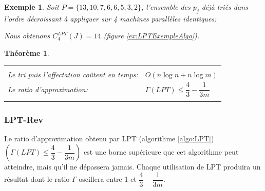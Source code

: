 \documentclass[a4paper,12pt]{report}
\theoremstyle{plain}				%
\newtheorem{theoreme}{Théorème}	%
\newtheorem{example}{Exemple}
\theoremstyle{definition}				%
\newcommand{\tdi}[1]{\todo[inline]{{#1}}{}}
\newcommand{\lcc}[1]{\todo[author=LCC,color=green,inline]{#1}}
\begin{document}
\begin{example}
Soit $P=\{13,10,7,6,6,5,3,2\}$, l'ensemble des $p_j$ déjà triés dans
l'ordre décroissant à appliquer sur 4 machines parallèles identiques:

Nous obtenons $C_4^{LPT}(J)=14$ (figure \ref{ex:LPTExempleAlgo}).
\end{example}

\begin{theoreme}
\begin{flushleft}
\begin{tabular}{|p{8cm}p{6cm}|}
\hline
& \\
Le tri puis l'affectation coûtent en temps:& $O(n \log n + n \log m)$
\\	%
Le ratio d'approximation:	&	$\Gamma(LPT)\leq \dfrac{4}{3} - \dfrac{1}{3m}$
\\
& \\
\hline
\end{tabular}
\end{flushleft}
\end{theoreme}


\subsubsection{LPT-Rev} %

Le ratio d'approximation obtenu par LPT (algorithme \ref{algo:LPT})
$(\Gamma(LPT)\leq \dfrac{4}{3} - \dfrac{1}{3m})$ est une borne
supérieure que cet algorithme peut atteindre, mais qu'il ne dépassera
jamais.
Chaque utilisation de LPT produira un résultat dont le ratio $\Gamma$
oscillera entre 1 et $\dfrac{4}{3} - \dfrac{1}{3m}$.
\bigskip
\end{document}

